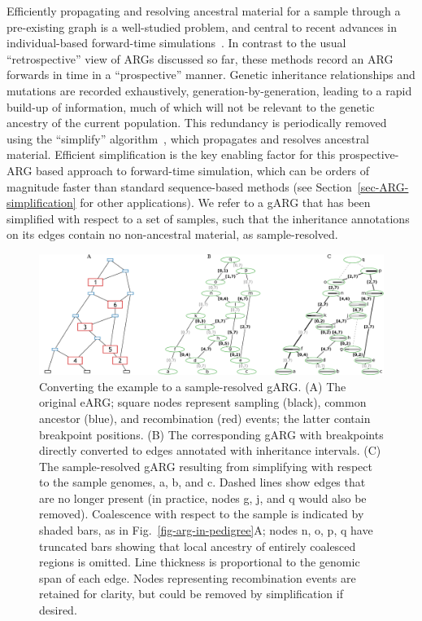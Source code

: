 \documentclass{article}
\newcommand{\noderef}[1]{\textsf{#1}}
\begin{document}
Efficiently propagating and resolving ancestral material for
a sample through a pre-existing graph is a well-studied problem,
and central to recent advances in individual-based forward-time
simulations~\citep{kelleher2018efficient,haller2018tree}.
In contrast to the usual ``retrospective'' view of ARGs
discussed so far, these methods record an ARG forwards in
time in a ``prospective'' manner. Genetic inheritance relationships
and mutations are recorded exhaustively, generation-by-generation,
leading to a rapid build-up of information, much of which
will not be relevant to the genetic ancestry of the current population.
This redundancy is periodically removed using the ``simplify''
algorithm~\citep{kelleher2018efficient}, which propagates and
resolves ancestral material.
Efficient simplification is the key enabling factor for
this prospective-ARG based approach to forward-time simulation,
which can be orders of magnitude faster than standard
sequence-based methods
(see Section~\ref{sec-ARG-simplification} for
other applications).
We refer to a gARG that has been simplified with respect to a set of
samples, such that the inheritance annotations on its edges contain
no non-ancestral material,  as sample-resolved.

\begin{figure}
\centering
\includegraphics[width=\textwidth]{illustrations/ancestry-resolution}
\caption{\label{fig-ancestry-resolution}
Converting the \citet[][Fig.~1]{wiuf1999recombination} example
to a sample-resolved gARG. (A) The original eARG; square nodes
represent sampling (black), common ancestor (blue), and recombination (red) events;
the latter contain breakpoint positions.
(B) The corresponding gARG with breakpoints directly converted to
edges annotated with inheritance intervals.
(C) The sample-resolved gARG resulting from simplifying with respect
to the sample genomes, \noderef{a}, \noderef{b}, and \noderef{c}.
Dashed lines show edges that are
no longer present (in practice, nodes \noderef{g}, \noderef{j}, and \noderef{q} would also be removed).
Coalescence with respect to the sample is indicated by shaded bars, as
in Fig.~\ref{fig-arg-in-pedigree}A; nodes \noderef{n}, \noderef{o}, \noderef{p}, \noderef{q} have truncated
bars showing that local ancestry of entirely coalesced regions is omitted.
Line thickness is proportional to the genomic span of each edge.
Nodes representing recombination events are retained
for clarity, but could be removed by simplification if
desired.
}
\end{figure}
\end{document}
